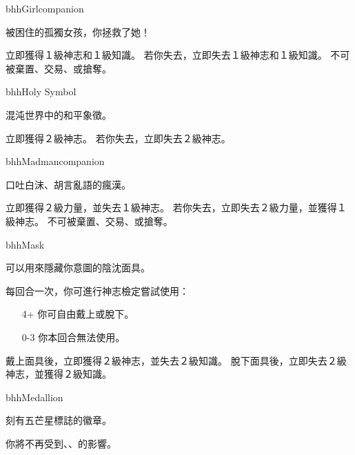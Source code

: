 \linebreak[0]%
\begin{OmenCard}{bhh}{Girl}{companion}
  \begin{CardStory}
    被困住的孤獨女孩，你拯救了她！
  \end{CardStory}
  立即獲得１級神志和１級知識。\smallbreak
  若你失去\ThisName{}，立即失去１級神志和１級知識。\smallbreak
  \ThisName{}不可被棄置、交易、或搶奪。\smallbreak
\end{OmenCard}%
\linebreak[0]%
\begin{OmenCard}{bhh}{Holy Symbol}{}
  \begin{CardStory}
    混沌世界中的和平象徵。
  \end{CardStory}
  立即獲得２級神志。\smallbreak
  若你失去\ThisName{}，立即失去２級神志。\smallbreak
\end{OmenCard}%
\linebreak[0]%
\begin{OmenCard}{bhh}{Madman}{companion}
  \begin{CardStory}
    口吐白沫、胡言亂語的瘋漢。
  \end{CardStory}
  立即獲得２級力量，並失去１級神志。\smallbreak
  若你失去\ThisName{}，立即失去２級力量，並獲得１級神志。\smallbreak
  \ThisName{}不可被棄置、交易、或搶奪。\smallbreak
\end{OmenCard}%
\linebreak[0]%
\begin{OmenCard}{bhh}{Mask}{}
  \begin{CardStory}
    可以用來隱藏你意圖的陰沈面具。
  \end{CardStory}
  每回合一次，你可進行神志檢定嘗試使用\ThisName{}：
  \begin{itemize}
    \item[4+] 你可自由戴上或脫下\ThisName{}。
    \item[0-3] 你本回合無法使用\ThisName{}。
  \end{itemize}
  戴上面具後，立即獲得２級神志，並失去２級知識。\smallbreak
  脫下面具後，立即失去２級神志，並獲得２級知識。\smallbreak
\end{OmenCard}%
\linebreak[0]%
\begin{OmenCard}{bhh}{Medallion}{}
  \begin{CardStory}
    刻有五芒星標誌的徽章。
  \end{CardStory}
  你將不再受到、、的影響。\smallbreak
\end{OmenCard}%
